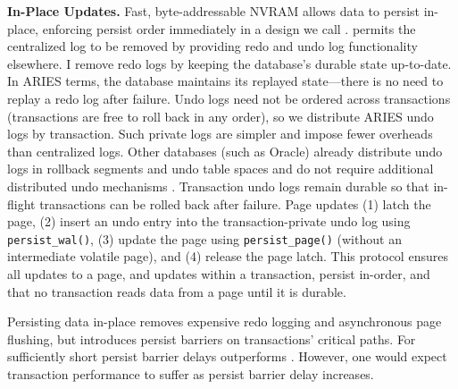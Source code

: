 \textbf{In-Place Updates.}
Fast, byte-addressable NVRAM allows data to persist in-place, enforcing persist order immediately in a design we call \InPlace.
\InPlace permits the centralized log to be removed by providing redo and undo log functionality elsewhere.
I remove redo logs by keeping the database's durable state up-to-date.
In ARIES terms, the database maintains its replayed state---there is no need to replay a redo log after failure.
Undo logs need not be ordered across transactions (transactions are free to roll back in any order), so we distribute ARIES undo logs by transaction.
Such private logs are simpler and impose fewer overheads than centralized logs.
Other databases (such as Oracle) already distribute undo logs in rollback segments and undo table spaces and do not require additional distributed undo mechanisms \cite{OracleDoc}.
Transaction undo logs remain durable so that in-flight transactions can be rolled back after failure.
Page updates (1) latch the page, (2) insert an undo entry into the transaction-private undo log using \texttt{persist\_wal()}, (3) update the page using \texttt{persist\_page()} (without an intermediate volatile page), and (4) release the page latch.
This protocol ensures all updates to a page, and updates within a transaction, persist in-order, and that no transaction reads data from a page until it is durable.

Persisting data in-place removes expensive redo logging and asynchronous page flushing, but introduces persist barriers on transactions' critical paths.
For sufficiently short persist barrier delays \InPlace outperforms \NVDisk.
However, one would expect transaction performance to suffer as persist barrier delay increases.

